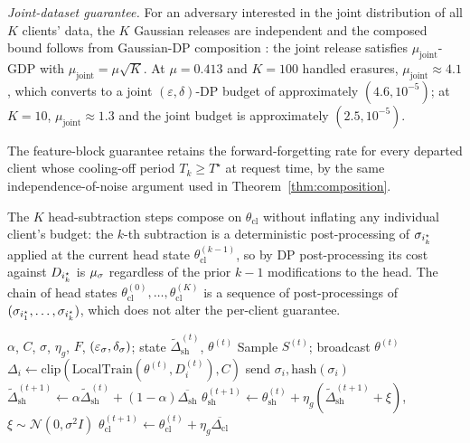 \textit{Joint-dataset guarantee.} For an adversary interested in the joint
distribution of all $K$ clients' data, the $K$ Gaussian releases are independent
and the composed bound follows from Gaussian-DP composition
\cite{dong2019gaussian}: the joint release satisfies $\mu_\mathrm{joint}$-GDP with
$\mu_\mathrm{joint} = \mu \sqrt{K}$. At $\mu = 0.413$ and $K = 100$ handled
erasures, $\mu_\mathrm{joint} \approx 4.1$, which converts to a joint
$(\varepsilon, \delta)$-DP budget of approximately $(4.6, 10^{-5})$; at $K = 10$,
$\mu_\mathrm{joint} \approx 1.3$ and the joint budget is approximately
$(2.5, 10^{-5})$.

The feature-block guarantee retains the forward-forgetting rate for every
departed client whose cooling-off period $T_k \ge T^\star$ at request time, by
the same independence-of-noise argument used in Theorem~\ref{thm:composition}.

The $K$ head-subtraction steps compose on $\theta_\mathrm{cl}$ without inflating any
individual client's budget: the $k$-th subtraction is a deterministic post-processing
of $\sigma_{i^{\star}_k}$ applied at the current head state
$\theta_\mathrm{cl}^{(k-1)}$, so by DP post-processing its cost against
$D_{i^{\star}_k}$ is $\mu_\sigma$ regardless of the prior $k{-}1$ modifications to the
head. The chain of head states $\theta_\mathrm{cl}^{(0)}, \ldots,
\theta_\mathrm{cl}^{(K)}$ is a sequence of post-processings of
$(\sigma_{i^{\star}_1}, \ldots, \sigma_{i^{\star}_k})$, which does not alter the per-client
guarantee.

\begin{algorithm}[t]
\footnotesize
\caption{FORGE training round $t$.}
\label{alg:decayed-aggregation}
\begin{algorithmic}[1]
\Require $\alpha$, $C$, $\sigma$, $\eta_g$, $F$, $(\varepsilon_\sigma, \delta_\sigma)$; state $\tilde\Delta_\mathrm{sh}^{(t)}$, $\theta^{(t)}$
\State Sample $S^{(t)}$; broadcast $\theta^{(t)}$
  \State $\Delta_i \gets \mathrm{clip}(\mathrm{LocalTrain}(\theta^{(t)}, D_i^{(t)}), C)$
   send $\sigma_i, \mathrm{hash}(\sigma_i)$ \EndIf
\EndFor
\State $\tilde\Delta_\mathrm{sh}^{(t+1)} \!\gets\! \alpha \tilde\Delta_\mathrm{sh}^{(t)} + (1{-}\alpha) \overline{\Delta_\mathrm{sh}}$ 
\State $\theta_\mathrm{sh}^{(t+1)} \gets \theta_\mathrm{sh}^{(t)} + \eta_g (\tilde\Delta_\mathrm{sh}^{(t+1)} + \xi)$, $\xi \sim \mathcal{N}(0, \sigma^2 I)$
\State $\theta_\mathrm{cl}^{(t+1)} \gets \theta_\mathrm{cl}^{(t)} + \eta_g \overline{\Delta_\mathrm{cl}}$ 
\end{algorithmic}
\end{algorithm}

